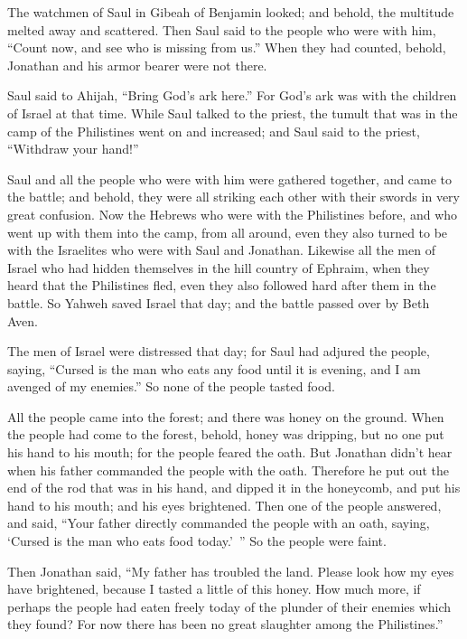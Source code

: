 {The watchmen of Saul in Gibeah of Benjamin looked; and behold, the multitude melted away and scattered.
Then Saul said to the people who were with him, “Count now, and see who is missing from us.” When they had counted, behold, Jonathan and his armor bearer were not there.
\par }{\PP {}Saul said to Ahijah, “Bring God’s ark here.” For God’s ark was with the children of Israel at that time.
While Saul talked to the priest, the tumult that was in the camp of the Philistines went on and increased; and Saul said to the priest, “Withdraw your hand!”
\par }{\PP {}Saul and all the people who were with him were gathered together, and came to the battle; and behold, they were all striking each other with their swords in very great confusion.
Now the Hebrews who were with the Philistines before, and who went up with them into the camp, from all around, even they also turned to be with the Israelites who were with Saul and Jonathan.
Likewise all the men of Israel who had hidden themselves in the hill country of Ephraim, when they heard that the Philistines fled, even they also followed hard after them in the battle.
So Yahweh saved Israel that day; and the battle passed over by Beth Aven.
\par }{\PP {}The men of Israel were distressed that day; for Saul had adjured the people, saying, “Cursed is the man who eats any food until it is evening, and I am avenged of my enemies.” So none of the people tasted food.
\par }{\PP {}All the people came into the forest; and there was honey on the ground.
When the people had come to the forest, behold, honey was dripping, but no one put his hand to his mouth; for the people feared the oath.
But Jonathan didn’t hear when his father commanded the people with the oath. Therefore he put out the end of the rod that was in his hand, and dipped it in the honeycomb, and put his hand to his mouth; and his eyes brightened.
Then one of the people answered, and said, “Your father directly commanded the people with an oath, saying, ‘Cursed is the man who eats food today.’ ” So the people were faint.
\par }{\PP {}Then Jonathan said, “My father has troubled the land. Please look how my eyes have brightened, because I tasted a little of this honey.
How much more, if perhaps the people had eaten freely today of the plunder of their enemies which they found? For now there has been no great slaughter among the Philistines.”
}
